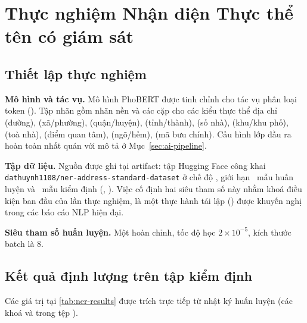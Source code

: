\section{Thực nghiệm Nhận diện Thực thể tên có giám sát}
\label{sec:exp-ner}

\subsection{Thiết lập thực nghiệm}
\label{sec:exp-ner-setup}

\textbf{Mô hình và tác vụ.} Mô hình PhoBERT \cite{nguyen2020phobert} được tinh chỉnh cho tác vụ phân loại token (). Tập nhãn gồm nhãn nền  và các cặp  cho các kiểu thực thể địa chỉ  (đường),  (xã/phường),  (quận/huyện),  (tỉnh/thành),  (số nhà),  (khu/khu phố),  (toà nhà),  (điểm quan tâm),  (ngõ/hẻm),  (mã bưu chính). Cấu hình lớp đầu ra hoàn toàn nhất quán với mô tả ở Mục~\ref{sec:ai-pipeline}.

\textbf{Tập dữ liệu.} Nguồn được ghi tại artifact: tập Hugging Face công khai \\ \texttt{dathuynh1108/ner-address-standard-dataset} ở chế độ , giới hạn \VNAIGENNERTrainN\, mẫu huấn luyện và \VNAIGENNEREvalN\, mẫu kiểm định (, ). Việc cố định hai siêu tham số này nhằm khoá điều kiện ban đầu của lần thực nghiệm, là một thực hành tái lập () được khuyến nghị trong các báo cáo NLP hiện đại.

\textbf{Siêu tham số huấn luyện.} Một  hoàn chỉnh, tốc độ học \(2 \times 10^{-5}\), kích thước batch là 8.

\subsection{Kết quả định lượng trên tập kiểm định}
\label{sec:exp-ner-results}

Các giá trị tại \cref{tab:ner-results} được trích trực tiếp từ nhật ký huấn luyện (các khoá  và  trong tệp ).


